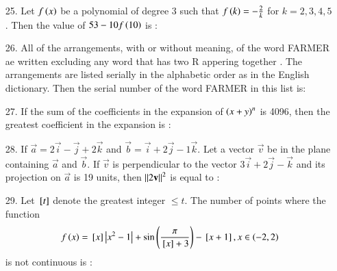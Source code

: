 \documentclass[journal,12pt,onecolumn]{IEEEtran}
\theoremstyle{remark}
\begin{document}
\begin{enumerate}
    \item[25.] Let $f\left(x\right)$  be a polynomial of degree 3 such that $f\left(k\right) = -\frac{2}{k}$ for $k = 2, 3, 4, 5$. Then the value of
        $53 - 10f\left(10\right)$ is :
        \hfill{}\\


    \item[26.] All of the arrangements, with or without meaning, of the word FARMER ae written excluding any word that has two R appering together . The arrangements
        are listed serially in the alphabetic order as in the English dictionary. Then the serial number of the word FARMER in this list is:
        \hfill{}\\


    \item[27.] If the sum of the coefficients in the expansion of $\left(x + y\right)^n$ is 4096, then the greatest coefficient in the expansion is :
        \hfill{}\\


    \item[28.] If $\vec{a} = 2\vec{i} - \vec{j} + 2\vec{k}$ and $\vec{b} = \vec{i} + 2\vec{j} - 1\vec{k}$. Let a vector $\vec{v}$ be in the plane containing
        $\vec{a}$ and $\vec{b}$. If $\vec{v}$ is perpendicular to the vector $3\vec{i} + 2\vec{j} - \vec{k}$ and its projection on $\vec{a}$ is 19 units, 
        then $\left\lVert2\mathbf{v}\right\rVert^2$ is equal to :
        \hfill{}\\


    \item[29.] Let ${}\left[t\right]$ denote the greatest integer $ \le t $. The number of points where the function
        \begin{align}
            f\left(x\right) = {}\left[x\right] \left\vert x^2 - 1\right\vert + \sin \left(\frac{\pi}{{}\left[x\right] + 3}\right) - {}\left[x + 1\right], x \in \left(-2, 2\right) 
        \end{align}
        is not continuous is :
        \hfill{}\\



\end{enumerate}
\end{document}
